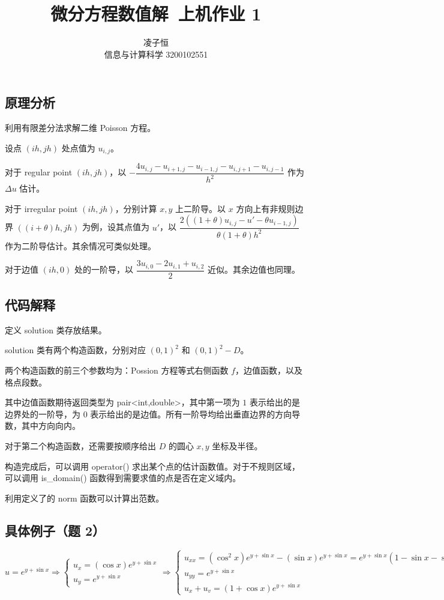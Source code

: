 \documentclass[12pt]{ctexart}
\title{微分方程数值解~上机作业 1}
\author{凌子恒 \\ 信息与计算科学 3200102551}
\begin{document}
\maketitle

\subsection{原理分析}

利用有限差分法求解二维 Poisson 方程。

设点 $(ih,jh)$ 处点值为 $u_{i,j}$。

对于 regular point $(ih,jh)$，以 $-\dfrac{4u_{i,j}-u_{i+1,j}-u_{i-1,j}-u_{i,j+1}-u_{i,j-1}}{h^2}$ 作为 $\Delta u$ 估计。

对于 irregular point $(ih,jh)$，分别计算 $x,y$ 上二阶导。以 $x$ 方向上有非规则边界 $((i+\theta)h,jh)$ 为例，设其点值为 $u'$，以 $\dfrac{2((1+\theta)u_{i,j}-u'-\theta u_{i-1,j})}{\theta(1+\theta)h^2}$ 作为二阶导估计。其余情况可类似处理。

对于边值 $(ih,0)$ 处的一阶导，以 $\dfrac{3u_{i,0}-2u_{i,1}+u_{i,2}}{2}$ 近似。其余边值也同理。

\subsection{代码解释}

定义 solution 类存放结果。

solution 类有两个构造函数，分别对应 $(0,1)^2$ 和 $(0,1)^2-D$。

两个构造函数的前三个参数均为：Possion 方程等式右侧函数 $f$，边值函数，以及格点段数。

其中边值函数期待返回类型为 pair<int,double>，其中第一项为 $1$ 表示给出的是边界处的一阶导，为 $0$ 表示给出的是边值。所有一阶导均给出垂直边界的方向导数，其中方向向内。

对于第二个构造函数，还需要按顺序给出 $D$ 的圆心 $x,y$ 坐标及半径。

构造完成后，可以调用 operator() 求出某个点的估计函数值。对于不规则区域，可以调用 is\_domain() 函数得到需要求值的点是否在定义域内。

利用定义了的 norm 函数可以计算出范数。

\subsection{具体例子（题 2）}

$u=e^{y+\sin x}\Rightarrow \begin{cases}
	u_x=(\cos x)e^{y+\sin x}\\
	u_y=e^{y+\sin x}
\end{cases}\Rightarrow \begin{cases}
	u_{xx}=(\cos^2 x)e^{y+\sin x}-(\sin x)e^{y+\sin x}=e^{y+\sin x}(1-\sin x-\sin^2 x)\\
	u_{yy}=e^{y+\sin x}\\
	u_x+u_v=(1+\cos x)e^{y+\sin x}
\end{cases}$
\end{document}
